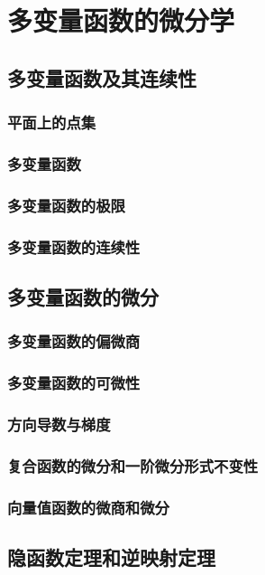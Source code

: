 \section{多变量函数的微分学}

\subsection{多变量函数及其连续性}
\subsubsection{平面上的点集}
\subsubsection{多变量函数}
\subsubsection{多变量函数的极限}
\subsubsection{多变量函数的连续性}

\subsection{多变量函数的微分}
\subsubsection{多变量函数的偏微商}
\subsubsection{多变量函数的可微性}
\subsubsection{方向导数与梯度}
\subsubsection{复合函数的微分和一阶微分形式不变性}
\subsubsection{向量值函数的微商和微分}

\subsection{隐函数定理和逆映射定理}
